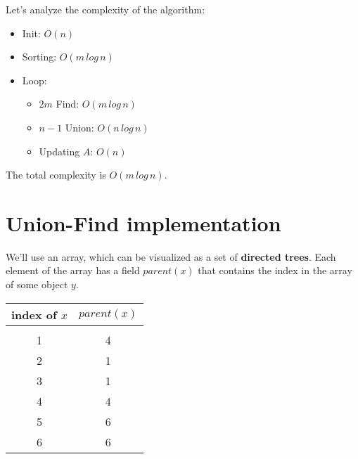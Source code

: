 Let's analyze the complexity of the algorithm:
\begin{itemize}
    \item Init: $O(n)$
    \item Sorting: $O(m\,log\,n)$
    \item Loop:
    \begin{itemize}
        \item $2m$ Find: $O(m\,log\,n)$
        \item $n-1$ Union: $O(n \, log\,n)$
        \item Updating $A$: $O(n)$
    \end{itemize}
\end{itemize}
The total complexity is $O(m \, log\, n)$.

\section{Union-Find implementation}
We'll use an array, which can be visualized as a set of \textbf{directed trees}. Each element of the array has a field $parent(x)$ that contains the index in the array of some object $y$.\newline\newline
\begin{tabular}{c|c}
    index of $x$ & $parent(x)$  \\
    \hline\\
     1 & 4\\
     2 & 1\\
     3 & 1\\
     4 & 4\\
     5 & 6\\
     6 & 6\\
\end{tabular}\newline\newline

